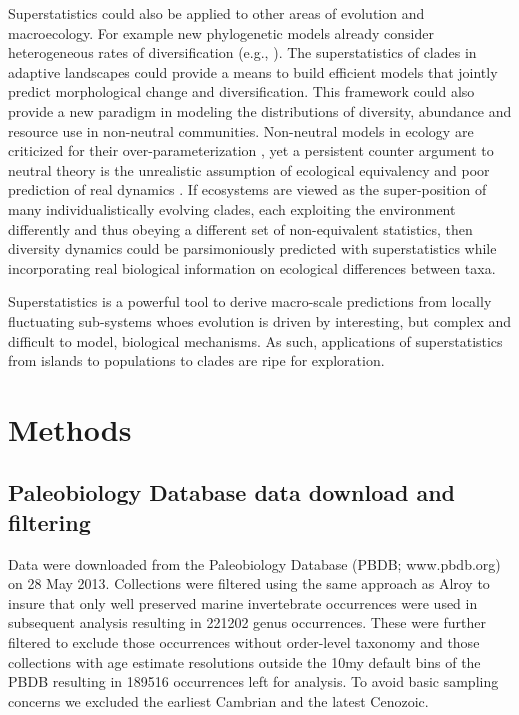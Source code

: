 \documentclass[12pt]{article}
\let\citep=\cite
\begin{document}
Superstatistics could also be applied to other areas of evolution and
macroecology.  For example new phylogenetic models already consider
heterogeneous rates of diversification (e.g.,
\citep{rabosky2006laser}). The superstatistics of clades in adaptive
landscapes could provide a means to build efficient models that
jointly predict morphological change and diversification. This
framework could also provide a new paradigm in modeling the
distributions of diversity, abundance and resource use in non-neutral
communities. Non-neutral models in ecology are criticized for their
over-parameterization \citep{rosindell2011}, yet a persistent counter
argument to neutral theory \citep{hubbell2001} is the unrealistic
assumption of ecological equivalency \citep{chave2004neutral} and poor
prediction of real dynamics \citep{ricklefs2006neutral}. If ecosystems
are viewed as the super-position of many individualistically evolving
clades, each exploiting the environment differently and thus obeying a
different set of non-equivalent statistics, then diversity dynamics
could be parsimoniously predicted with superstatistics while
incorporating real biological information on ecological differences
between taxa.

Superstatistics is a powerful tool to derive macro-scale predictions
from locally fluctuating sub-systems whoes evolution is driven by
interesting, but complex and difficult to model, biological
mechanisms. As such, applications of superstatistics from islands to
populations to clades are ripe for exploration.


\section*{Methods}

\subsection*{Paleobiology Database data download and filtering}
Data were downloaded from the Paleobiology Database (PBDB;
www.pbdb.org) on 28 May 2013. Collections were filtered using the same
approach as Alroy \citep{alroy08} to insure that only well preserved
marine invertebrate occurrences were used in subsequent analysis
resulting in 221202 genus occurrences. These were further filtered to
exclude those occurrences without order-level taxonomy and those
collections with age estimate resolutions outside the 10my default
bins of the PBDB resulting in 189516 occurrences left for analysis. To
avoid basic sampling concerns we excluded the earliest Cambrian and
the latest Cenozoic.
\end{document}
